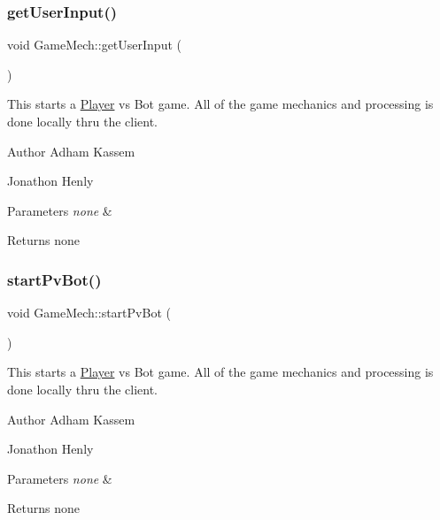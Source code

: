\subsubsection{\texorpdfstring{get\+User\+Input()}{getUserInput()}}
{\footnotesize\ttfamily void Game\+Mech\+::get\+User\+Input (\begin{DoxyParamCaption}{ }\end{DoxyParamCaption})\hspace{0.3cm}{\ttfamily [inline]}}

This starts a \hyperlink{classPlayer}{Player} vs Bot game. All of the game mechanics and processing is done locally thru the client. \begin{DoxyAuthor}{Author}
Adham Kassem 

Jonathon Henly 
\end{DoxyAuthor}

\begin{DoxyParams}{Parameters}
{\em none} & \\
\hline
\end{DoxyParams}
\begin{DoxyReturn}{Returns}
none 
\end{DoxyReturn}
\mbox{\label{classGameMech_aceb6fd4797f93d9ffa9601a16b05eea6}} 
\subsubsection{\texorpdfstring{start\+Pv\+Bot()}{startPvBot()}}
{\footnotesize\ttfamily void Game\+Mech\+::start\+Pv\+Bot (\begin{DoxyParamCaption}{ }\end{DoxyParamCaption})\hspace{0.3cm}{\ttfamily [inline]}}

This starts a \hyperlink{classPlayer}{Player} vs Bot game. All of the game mechanics and processing is done locally thru the client.

\begin{DoxyAuthor}{Author}
Adham Kassem 

Jonathon Henly 
\end{DoxyAuthor}

\begin{DoxyParams}{Parameters}
{\em none} & \\
\hline
\end{DoxyParams}
\begin{DoxyReturn}{Returns}
none 
\end{DoxyReturn}
\mbox{\label{classGameMech_a2e6458b7b49afecdba3b1c2103d7875d}} 
